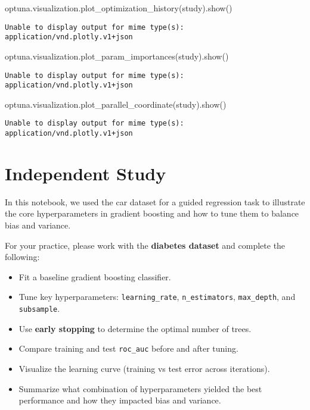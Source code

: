 \documentclass[
  letterpaper,
  DIV=11,
  numbers=noendperiod]{scrreprt}
\newenvironment{Shaded}{\begin{snugshade}}{\end{snugshade}}
\newcommand{\NormalTok}[1]{\textcolor[rgb]{0.00,0.23,0.31}{#1}}
\providecommand{\tightlist}{%
  \setlength{\itemsep}{0pt}\setlength{\parskip}{0pt}}\usepackage{longtable,booktabs,array}
\begin{document}
\begin{Shaded}
\begin{Highlighting}[]
\NormalTok{optuna.visualization.plot\_optimization\_history(study).show()}
\end{Highlighting}
\end{Shaded}

\begin{verbatim}
Unable to display output for mime type(s): application/vnd.plotly.v1+json
\end{verbatim}

\begin{Shaded}
\begin{Highlighting}[]
\NormalTok{optuna.visualization.plot\_param\_importances(study).show()}
\end{Highlighting}
\end{Shaded}

\begin{verbatim}
Unable to display output for mime type(s): application/vnd.plotly.v1+json
\end{verbatim}

\begin{Shaded}
\begin{Highlighting}[]
\NormalTok{optuna.visualization.plot\_parallel\_coordinate(study).show()}
\end{Highlighting}
\end{Shaded}

\begin{verbatim}
Unable to display output for mime type(s): application/vnd.plotly.v1+json
\end{verbatim}

\section{Independent Study}\label{independent-study}

In this notebook, we used the car dataset for a guided regression task
to illustrate the core hyperparameters in gradient boosting and how to
tune them to balance bias and variance.

For your practice, please work with the \textbf{diabetes dataset} and
complete the following:

\begin{itemize}
\tightlist
\item
  Fit a baseline gradient boosting classifier.
\item
  Tune key hyperparameters: \texttt{learning\_rate},
  \texttt{n\_estimators}, \texttt{max\_depth}, and \texttt{subsample}.
\item
  Use \textbf{early stopping} to determine the optimal number of trees.
\item
  Compare training and test \texttt{roc\_auc} before and after tuning.
\item
  Visualize the learning curve (training vs test error across
  iterations).
\item
  Summarize what combination of hyperparameters yielded the best
  performance and how they impacted bias and variance.
\end{itemize}
\end{document}

